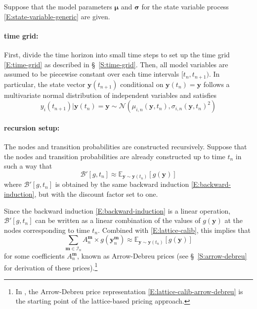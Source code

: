 \documentclass{texyise}
\newcommand{\indexset}{\mathcal{I}}
\newcommand{\valuebackward}{\mathcal{B}}
\begin{document}
Suppose that the model parameters $\bm{\mu}$ and $\bm{\sigma}$ for the state variable process \eqref{E:state-variable-generic} are given.

\paragraph*{time grid:}

First, divide the time horizon into small time steps to set up the time grid \eqref{E:time-grid} as described in \S~\ref{S:time-grid}. Then, all model variables are assumed to be piecewise constant over each time intervals $[t_n, t_{n+1})$.
In particular, the state vector $\bm{y}(t_{n+1})$ conditional on $\bm{y}(t_n) = \bm{y}$ follows a multivariate normal distribution of independent variables and satisfies
\begin{equation}
    y_i(t_{n+1}) | \bm{y}(t_n) = \bm{y}  \sim \mathcal{N}(\mu_{i,n}(\bm{y},t_n), \sigma_{i,n}(\bm{y},t_n)^2)
    \label{E:conditional-distribution}
\end{equation}

\paragraph*{recursion setup:}

The nodes and transition probabilities are constructed recursively. Suppose that the nodes and transition probabilities are already constructed up to time $t_n$ in such a way that 
\begin{equation}
    \valuebackward'[g, t_n] \approx \mathbb{E}_{\bm{y}\sim\bm{y}(t_n)}\left[ g(\bm{y}) \right] 
    \label{E:lattice-calib}
\end{equation}
where $\valuebackward'[g, t_n]$ is obtained by the same backward induction \eqref{E:backward-induction}, but with the discount factor set to one. 

Since the backward induction \eqref{E:backward-induction} is a linear operation, 
$\valuebackward'[g, t_n]$ can be written as a linear combination of the values of $g(\bm{y})$ at the nodes corresponding to time $t_n$. Combined with \eqref{E:lattice-calib}, this implies that
\begin{equation}
\sum_{\bm{m} \in \indexset_n} A_{n}^{\bm{m}} \times g(\bm{y}_n^{\bm{m}}) \approx \mathbb{E}_{\bm{y}\sim \bm{y}(t_n)}\left[ g(\bm{y}) \right] 
\label{E:lattice-calib-arrow-debreu}
\end{equation}
for some coefficients $A_{n}^{\bm{m}}$, known as Arrow-Debreu prices (see \S~\ref{S:arrow-debreu} for derivation of these prices).\footnote{In \cite{2fs-citi-mv}, the Arrow-Debreu price representation \eqref{E:lattice-calib-arrow-debreu}
is the starting point of the lattice-based pricing approach.}
\end{document}
